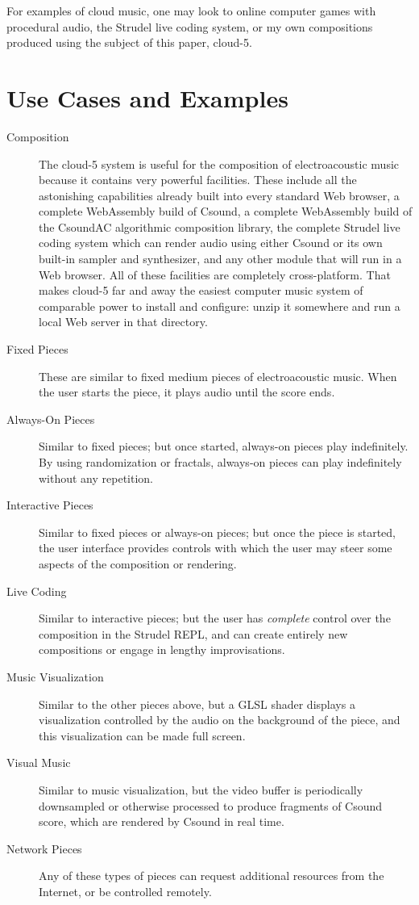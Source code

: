 \documentclass[runningheads,a4paper]{llncs}
\begin{document}
For examples of cloud music, one may look to online computer games with procedural audio, the Strudel live coding system, or my own compositions produced using the subject of this paper, cloud-5.

\section{Use Cases and Examples}

\begin{description}
\item[Composition] The cloud-5 system is useful for the composition of electroacoustic music because it contains very powerful facilities. These include all the astonishing capabilities already built into every standard Web browser, a complete WebAssembly build of Csound, a complete WebAssembly build of the CsoundAC algorithmic composition library, the complete Strudel live coding system which can render audio using either Csound or its own built-in sampler and synthesizer, and any other module that will run in a Web browser. All of these facilities are completely cross-platform. That makes cloud-5 far and away the easiest computer music system of comparable power to install and configure: unzip it somewhere and run a local Web server in that directory. 
\item[Fixed Pieces] These are similar to fixed medium pieces of electroacoustic music. When the user starts the piece, it plays audio until the score ends. 
\item[Always-On Pieces] Similar to fixed pieces; but once started, always-on pieces play indefinitely. By using randomization or fractals, always-on pieces can play indefinitely without any repetition.
\item[Interactive Pieces] Similar to fixed pieces or always-on pieces; but once the piece is started, the user interface provides controls with which the user may steer some aspects of the composition or rendering.
\item[Live Coding] Similar to interactive pieces; but the user has \emph{complete} control over the composition in the Strudel REPL, and can create entirely new compositions or engage in lengthy improvisations.
\item[Music Visualization] Similar to the other pieces above, but a GLSL shader displays a visualization controlled by the audio on the background of the piece, and this visualization can be made full screen.
\item[Visual Music] Similar to music visualization, but the video buffer is periodically downsampled or otherwise processed to produce fragments of Csound score, which are rendered by Csound in real time.
\item[Network Pieces] Any of these types of pieces can request additional resources from the Internet, or be controlled remotely.
\end{description}
\end{document}
